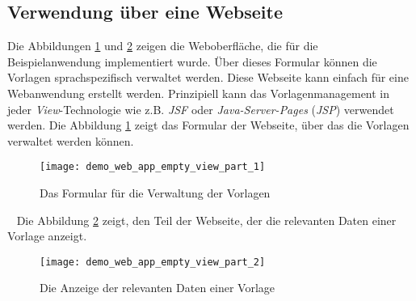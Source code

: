 \subsection{Verwendung über eine Webseite}
Die Abbildungen \ref{fig:demo_web_app_empty_view_part_1} und \ref{fig:demo_web_app_empty_view_part_2} zeigen die Weboberfläche, die für die Beispielanwendung implementiert wurde. Über dieses Formular können die Vorlagen sprachspezifisch verwaltet werden. Diese Webseite kann einfach für eine Webanwendung erstellt werden. Prinzipiell kann das Vorlagenmanagement in jeder \emph{View}-Technologie wie z.B. \emph{JSF} oder \emph{Java-Server-Pages} (\emph{JSP}) verwendet werden.
\newline
\newline
Die Abbildung \ref{fig:demo_web_app_empty_view_part_1} zeigt das Formular der Webseite, über das die Vorlagen verwaltet werden können.
\newpage
\begin{figure}[h]
\centering
\texttt{[image: demo\_web\_app\_empty\_view\_part\_1]}
\caption{Das Formular für die Verwaltung der Vorlagen}
\label{fig:demo_web_app_empty_view_part_1}
\end{figure}
\ \newline
Die Abbildung \ref{fig:demo_web_app_empty_view_part_2} zeigt, den Teil der Webseite, der die relevanten Daten einer Vorlage anzeigt.

\begin{figure}[h]
\centering
\texttt{[image: demo\_web\_app\_empty\_view\_part\_2]}
\caption{Die Anzeige der relevanten Daten einer Vorlage}
\label{fig:demo_web_app_empty_view_part_2}
\end{figure}
\ \newpage

